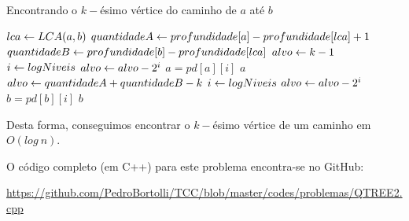 \begin{algorithm}[H]
\caption{Encontrando o $k-$ésimo vértice do caminho de $a$ até $b$}
\begin{algorithmic}[1]
    \State $lca \leftarrow LCA(a, b)$
    \State $quantidadeA \leftarrow profundidade[a] - profundidade[lca] + 1$
    \State $quantidadeB \leftarrow profundidade[b] - profundidade[lca]$
        \State $alvo \leftarrow k - 1$
        \State $i \leftarrow logNiveis$
                \State $alvo \leftarrow alvo - 2^i$
                \State $a = pd[a][i]$
            \EndIf
        \EndWhile
        \Return $a$
    \Else
        \State $alvo \leftarrow quantidadeA + quantidadeB - k$
        \State $i \leftarrow logNiveis$
                \State $alvo \leftarrow alvo - 2^i$
                \State $b = pd[b][i]$
            \EndIf
        \EndWhile
        \Return $b$
    \EndIf
\EndFunction
\end{algorithmic}
\end{algorithm}

Desta forma, conseguimos encontrar o $k-$ésimo vértice de um caminho em $O(log\ n)$.

\vspace{0.5cm}

O código completo (em C++) para este problema encontra-se no GitHub:

\url{https://github.com/PedroBortolli/TCC/blob/master/codes/problemas/QTREE2.cpp}

\vspace{0.3cm}

